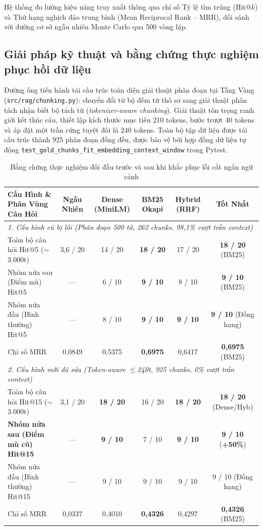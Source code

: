Hệ thống đo lường hiệu năng truy xuất thông qua chỉ số Tỷ lệ tìm trúng (Hit@$k$) và Thứ hạng nghịch đảo trung bình (Mean Reciprocal Rank -- MRR), đối sánh với đường cơ sở ngẫu nhiên Monte Carlo qua 500 vòng lặp.

\subsection{Giải pháp kỹ thuật và bằng chứng thực nghiệm phục hồi dữ liệu}
Đường ống tiến hành tái cấu trúc toàn diện giải thuật phân đoạn tại Tầng Vàng (\texttt{src/rag/chunking.py}): chuyển đổi từ bộ đếm từ thô sơ sang giải thuật phân tách nhận biết bộ tách từ (\textit{tokenizer-aware chunking}). Giải thuật tôn trọng ranh giới kết thúc câu, thiết lập kích thước mục tiêu 210 tokens, bước trượt 40 tokens và áp đặt một trần cứng tuyệt đối là 240 tokens. Toàn bộ tập dữ liệu được tái cấu trúc thành 925 phân đoạn đồng đều, được bảo vệ bởi hợp đồng dữ liệu tự động \texttt{test\_gold\_chunks\_fit\_embedding\_context\_window} trong Pytest.

\begin{table}[htbp]
\centering
\scriptsize
\setlength{\tabcolsep}{3pt}
\caption{Bằng chứng thực nghiệm đối đầu trước và sau khi khắc phục lỗi cắt ngắn ngữ cảnh}
\label{tab:truncation_recovery}
\begin{tabularx}{\textwidth}{X c c c c c}
\toprule
\textbf{Cấu Hình \& Phân Vùng Câu Hỏi} & \textbf{Ngẫu Nhiên} & \textbf{Dense (MiniLM)} & \textbf{BM25 Okapi} & \textbf{Hybrid (RRF)} & \textbf{Tốt Nhất} \\
\midrule
\multicolumn{6}{l}{\textit{1. Cấu hình cũ bị lỗi (Phân đoạn 500 từ, 262 chunks, 98,1\% vượt trần context)}} \\
Toàn bộ câu hỏi Hit@5 ($\sim$3.000t) & 3,6 / 20 & 14 / 20 & \textbf{18 / 20} & 17 / 20 & \textbf{18 / 20} (BM25) \\
Nhóm nửa sau (Điểm mù) Hit@5 & --- & 6 / 10 & \textbf{9 / 10} & 8 / 10 & \textbf{9 / 10} (BM25) \\
Nhóm nửa đầu (Bình thường) Hit@5 & --- & 8 / 10 & \textbf{9 / 10} & \textbf{9 / 10} & \textbf{9 / 10} (Đồng hạng) \\
Chỉ số MRR & 0,0849 & 0,5375 & \textbf{0,6975} & 0,6417 & \textbf{0,6975} (BM25) \\
\midrule
\multicolumn{6}{l}{\textit{2. Cấu hình mới đã sửa (Token-aware $\le$240t, 925 chunks, 0\% vượt trần context)}} \\
Toàn bộ câu hỏi Hit@15 ($\sim$3.000t) & 3,1 / 20 & \textbf{18 / 20} & 16 / 20 & \textbf{18 / 20} & \textbf{18 / 20} (Dense/Hyb) \\
\textbf{Nhóm nửa sau (Điểm mù cũ) Hit@15} & --- & \textbf{9 / 10} & 7 / 10 & \textbf{9 / 10} & \textbf{9 / 10} (\textbf{+50\%}) \\
Nhóm nửa đầu (Bình thường) Hit@15 & --- & 9 / 10 & 9 / 10 & 9 / 10 & 9 / 10 (Đồng hạng) \\
Chỉ số MRR & 0,0337 & 0,4010 & \textbf{0,4326} & 0,4297 & \textbf{0,4326} (BM25) \\
\bottomrule
\end{tabularx}
\end{table}

